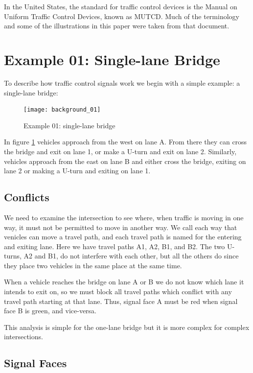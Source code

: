 \documentclass[letterpaper,twoside]{article}
\begin{document}
In the United States, the standard for traffic control devices is the
Manual on Uniform Traffic Control Devices, known as MUTCD\citep{MUTCD11}.
Much of the terminology and some of the illustrations
in this paper were taken from that document.

\section{Example 01: Single-lane Bridge}

To describe how traffic control signals work we begin with a simple
example: a single-lane bridge:

\begin{figure}[htb]
  {\texttt{[image: background\_01]}}
  {\caption{Example 01: single-lane bridge}\label{fig:single-lane_bridge}}
\end{figure}

In figure \ref{fig:single-lane_bridge} vehicles approach from the west
on lane A.  From there they can cross the bridge and exit on lane 1,
or make a U-turn and exit on lane 2.  Similarly, vehicles approach
from the east on lane B and either cross the bridge, exiting on lane 2
or making a U-turn and exiting on lane 1.

\subsection{Conflicts}

We need to examine the intersection to see where, when traffic is moving
in one way, it must not be permitted to move in another way.  We call each
way that venicles can move a travel path, and each travel path is named
for the entering and exiting lane.  Here we have travel paths A1, A2, B1,
and B2.  The two U-turns, A2 and B1, do not interfere with each other, but
all the others do since they place two vehicles in the same place at the
same time.

When a vehicle reaches the bridge on lane A or B we do not
know which lane it intends to exit on, so we must block all travel paths
which conflict with any travel path starting at that lane.  Thus,
signal face A must be red when signal face B is green, and vice-versa.

This analysis is simple for the one-lane bridge but it is more complex
for complex intersections.

\subsection{Signal Faces}
\end{document}
